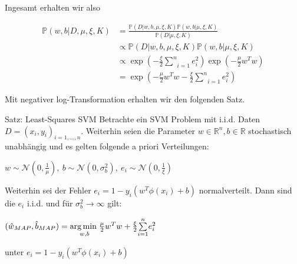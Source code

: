 \documentclass{beamer}
\begin{document}
{\begin{frame}
\end{frame}


\begin{frame}
Ingesamt erhalten wir also


\begin{align}
	\mathbb{P}(w,b\vert D,\mu,\xi,K) &= \frac{\mathbb{P}(D\vert w,b, \mu,\xi,K)					\mathbb{P}(w,b\vert \mu,\xi , K)}{\mathbb{P}(D\vert \mu,\xi,K)}  \\
	& \propto \mathbb{P}(D\vert w,b, \mu,\xi,K)\mathbb{P}(w,b\vert \mu,\xi , K) \\
	&\propto \exp(-\frac{\xi}{2}\underset{i=1}{\overset{n}{\sum}}e_i^2)\exp(-\frac{\mu}{2}		w^Tw) \\
	& = \exp(-\frac{\mu}{2}w^Tw - \frac{\xi}{2}\underset{i=1}{\overset{n}{\sum}}e_i^2)
\end{align}

Mit negativer log-Transformation erhalten wir den folgenden Satz.

\end{frame}


\begin{frame}
\begin{block}{Satz: Least-Squares SVM}
Betrachte ein SVM Problem mit i.i.d. Daten $D = (x_i,y_i)_{i=1,...,n}$. Weiterhin seien die Parameter $w\in \mathbb{R}^n, b\in \mathbb{R}$ stochastisch unabhängig und es gelten folgende a priori Verteilungen:

\begin{center}
$w \sim \mathcal{N}(0,\frac{1}{\mu}), \: b \sim \mathcal{N}(0, \sigma_b^2), \: e_i \sim \mathcal{N}(0,\frac{1}{\xi})$
\end{center}
 
Weiterhin sei der Fehler $e_i =  1 - y_i(w^T \phi(x_i) +b)$ normalverteilt. Dann
sind die $e_i$ i.i.d. und für $\sigma_b^2 \rightarrow \infty$ gilt:

\begin{center}
$(\hat{w}_{MAP},\hat{b}_{MAP})  = \underset{w,b}{\arg \min \hspace{0.1cm}} \frac{\mu}{2}w^Tw + \frac{\xi}{2}\underset{i=1}{\overset{n}{\sum}}e_i^2$

unter $e_i = 1 - y_i(w^T \phi(x_i) +b)$
\end{center}

\end{block}


\end{frame}}
\end{document}
